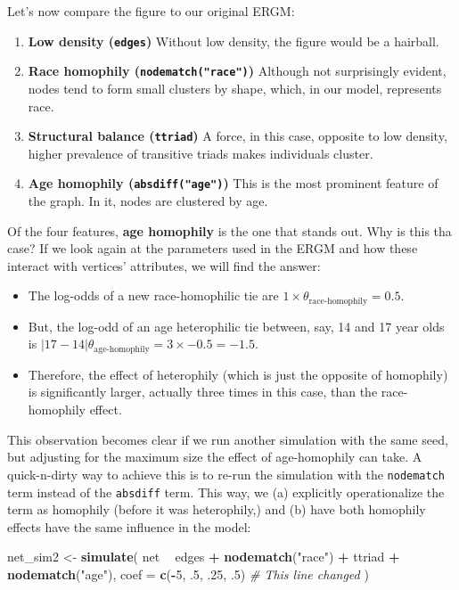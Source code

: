 \documentclass[]{book}
\newenvironment{Shaded}{\begin{snugshade}}{\end{snugshade}}
\newcommand{\CommentTok}[1]{\textcolor[rgb]{0.56,0.35,0.01}{\textit{#1}}}
\newcommand{\DataTypeTok}[1]{\textcolor[rgb]{0.13,0.29,0.53}{#1}}
\newcommand{\DecValTok}[1]{\textcolor[rgb]{0.00,0.00,0.81}{#1}}
\newcommand{\FloatTok}[1]{\textcolor[rgb]{0.00,0.00,0.81}{#1}}
\newcommand{\KeywordTok}[1]{\textcolor[rgb]{0.13,0.29,0.53}{\textbf{#1}}}
\newcommand{\NormalTok}[1]{#1}
\newcommand{\OperatorTok}[1]{\textcolor[rgb]{0.81,0.36,0.00}{\textbf{#1}}}
\newcommand{\StringTok}[1]{\textcolor[rgb]{0.31,0.60,0.02}{#1}}
\begin{document}
Let's now compare the figure to our original ERGM:

\begin{enumerate}
\def\labelenumi{\arabic{enumi}.}
\item
  \textbf{Low density (\texttt{edges})} Without low density, the figure would be
  a hairball.
\item
  \textbf{Race homophily (\texttt{nodematch("race")})} Although not surprisingly evident,
  nodes tend to form small clusters by shape, which, in our model, represents
  race.
\item
  \textbf{Structural balance (\texttt{ttriad})} A force, in this case, opposite to low
  density, higher prevalence of transitive triads makes individuals cluster.
\item
  \textbf{Age homophily (\texttt{absdiff("age")})} This is the most prominent feature of
  the graph. In it, nodes are clustered by age.
\end{enumerate}

Of the four features, \textbf{age homophily} is the one that stands out. Why is this
tha case? If we look again at the parameters used in the ERGM and how these
interact with vertices' attributes, we will find the answer:

\begin{itemize}
\item
  The log-odds of a new race-homophilic tie are \(1\times\theta_{\mbox{race-homophily}} = 0.5\).
\item
  But, the log-odd of an age heterophilic tie between, say, 14 and 17 year
  olds is \(|17-14|\theta_{\mbox{age-homophily}} = 3\times -0.5 = -1.5\).
\item
  Therefore, the effect of heterophily (which is just the opposite of homophily)
  is significantly larger, actually three times in this case, than the race-homophily
  effect.
\end{itemize}

This observation becomes clear if we run another simulation with the same seed, but
adjusting for the maximum size the effect of age-homophily can take. A
quick-n-dirty way to achieve this is to re-run the simulation with the \texttt{nodematch}
term instead of the \texttt{absdiff} term. This way, we (a) explicitly operationalize
the term as homophily (before it was heterophily,) and (b) have both homophily
effects have the same influence in the model:

\begin{Shaded}
\begin{Highlighting}[]
\NormalTok{net_sim2 <-}\StringTok{ }\KeywordTok{simulate}\NormalTok{(}
\NormalTok{    net }\OperatorTok{~}\StringTok{ }\NormalTok{edges }\OperatorTok{+}
\StringTok{    }\KeywordTok{nodematch}\NormalTok{(}\StringTok{"race"}\NormalTok{) }\OperatorTok{+}
\StringTok{    }\NormalTok{ttriad }\OperatorTok{+}
\StringTok{    }\KeywordTok{nodematch}\NormalTok{(}\StringTok{"age"}\NormalTok{),}
    \DataTypeTok{coef =} \KeywordTok{c}\NormalTok{(}\OperatorTok{-}\DecValTok{5}\NormalTok{, }\FloatTok{.5}\NormalTok{, }\FloatTok{.25}\NormalTok{, }\FloatTok{.5}\NormalTok{) }\CommentTok{# This line changed}
\NormalTok{    )}
\end{Highlighting}
\end{Shaded}
\end{document}
